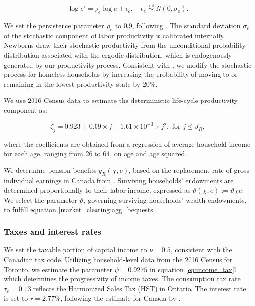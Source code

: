 \documentclass[parskip=full]{article}
\begin{document}
\begin{equation*}
  \log e' = \rho_{e} \log e + \epsilon_{e},\quad \epsilon_{e}\overset{\mathrm{i.i.d.}} \sim N(0,\sigma_{e}).
\end{equation*}

\noindent We set the persistence parameter $\rho_{e}$ to 0.9, following \citet{gkkoc}. The standard deviation $\sigma_{e}$ of the stochastic component of labor productivity is calibrated internally. Newborns draw their stochastic productivity from the unconditional probability distribution associated with the ergodic distribution, which is endogenously generated by our productivity process. Consistent with \citet{az-2024}, we modify the stochastic process for homeless households by increasing the probability of moving to or remaining in the lowest productivity state by 20\%.  

We use 2016 Census data to estimate the deterministic life-cycle productivity component as:

\begin{equation*}
\zeta_j = 0.923+0.09\times j-1.61\times 10^{-3}\times j^{2}, \mbox{ for } j\leq J_{R},
\end{equation*}

\noindent where the coefficients are obtained from a regression of average household income for each age, ranging from 26 to 64, on age and age squared. 

We determine pension benefits ${y_{R}(\chi,e)}$, based on the replacement rate of gross individual earnings in Canada from \citet{OECD-pension}. Surviving households' endowments are determined proportionally to their labor income, expressed as $\vartheta(\chi,e):=\vartheta \chi e$. We select the parameter $\vartheta$, governing surviving households' wealth endowments, to fulfill equation \eqref{market_clearing:agg_bequests}.

\subsubsection{Taxes and interest rates}

We set the taxable portion of capital income to $\nu=0.5$, consistent with the Canadian tax code. Utilizing household-level data from the 2016 Census for Toronto, we estimate the parameter $\psi=0.9275$ in equation \eqref{eq:income_tax}l which determines the progressivity of income taxes. The consumption tax rate $\tau_{c}=0.13$ reflects the Harmonized Sales Tax (HST) in Ontario. The interest rate is set to $r=2.77\%$, following the estimate for Canada by \citet{bruneau-etal-2018}.
\end{document}
